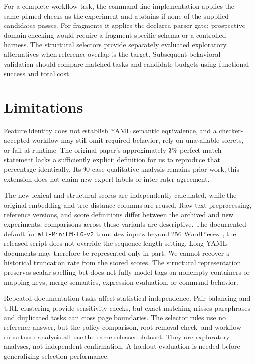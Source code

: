 For a complete-workflow task, the command-line implementation applies the same pinned checks as the experiment and abstains if none of the supplied candidates passes. For fragments it applies the declared parser gate; prospective domain checking would require a fragment-specific schema or a controlled harness. The structural selectors provide separately evaluated exploratory alternatives when reference overlap is the target. Subsequent behavioral validation should compare matched tasks and candidate budgets using functional success and total cost.

\section{Limitations}
Feature identity does not establish YAML semantic equivalence, and a checker-accepted workflow may still omit required behavior, rely on unavailable secrets, or fail at runtime. The original paper's approximately 3\% perfect-match statement lacks a sufficiently explicit definition for us to reproduce that percentage identically. Its 90-case qualitative analysis remains prior work; this extension does not claim new expert labels or inter-rater agreement.

The new lexical and structural scores are independently calculated, while the original embedding and tree-distance columns are reused. Raw-text preprocessing, reference versions, and score definitions differ between the archived and new experiments; comparisons across those variants are descriptive. The documented default for \texttt{all-MiniLM-L6-v2} truncates inputs beyond 256 WordPieces~\cite{sbert}; the released script does not override the sequence-length setting. Long YAML documents may therefore be represented only in part. We cannot recover a historical truncation rate from the stored scores. The structural representation preserves scalar spelling but does not fully model tags on nonempty containers or mapping keys, merge semantics, expression evaluation, or command behavior.

Repeated documentation tasks affect statistical independence. Pair balancing and URL clustering provide sensitivity checks, but exact matching misses paraphrases and duplicated tasks can cross page boundaries. The selector rules use no reference answer, but the policy comparison, root-removal check, and workflow robustness analysis all use the same released dataset. They are exploratory analyses, not independent confirmation. A holdout evaluation is needed before generalizing selection performance.

